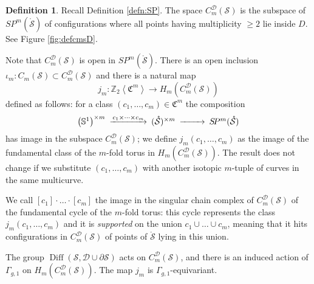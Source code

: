 \documentclass{amsart}
\theoremstyle{plain}
\theoremstyle{definition}
\newtheorem{defn}[thm]  {Definition}
\newcommand{\cC}{\mathfrak{C}}
\newcommand{\D}{\mathcal{D}}
\renewcommand{\S}{\mathcal{S}}
\newcommand{\Z}{\mathbb{Z}}
\renewcommand{\gg}{\Gamma_{g,1}}
\newcommand{\cms}{C_m(\S)}
\newcommand{\cmsD}{C_{m}^{\D}(\S)}
\renewcommand{\j}{j}
\newcommand{\ZcC}[1]{\Z_2\left<\cC^{#1}\right>}
\newcommand{\pa}[1]{\left(#1\right)}
\newcommand{\Sone}{\mathbb{S}^1}
\newcommand{\mrS}{\mathring{\S}}
\newcommand{\SP}{S\!P}
\DeclareMathOperator{\Diff}{Diff}
\begin{document}
\begin{defn}
 \label{defn:cmsD}
 Recall Definition \ref{defn:SP}.
 The space $\cmsD$ is the subspace of $\SP^m(\mrS)$ of configurations where all points
 having multiplicity $\geq 2$ lie inside $D$.
 See Figure \ref{fig:defcmsD}.
 
  Note that $\cmsD$ is open in $\SP^m(\mrS)$. There is an open inclusion $\iota_m\colon\cms\subset\cmsD$ and there is a natural map
  \[
  \j_m\colon \ZcC{m}\to H_m(\cmsD)
  \]
  defined as follows: for a class $(c_1,\dots,c_m)\in\cC^m$
  the composition
  \[
   \begin{CD}
    \pa{\Sone}^{\times m} @>c_1\times\dots\times c_m >> (\mrS)^{\times m} @>>> \SP^m(\mrS)
   \end{CD}
  \]
has image in the subspace $\cmsD$; we define $\j_m(c_1,\dots,c_m)$ as the image
of the fundamental class
of the $m$-fold torus in $H_m(\cmsD)$. The result does not change
if we substitute $(c_1,\dots,c_m)$ with another isotopic $m$-tuple of curves in the same multicurve.

We call $[c_1]\cdot\ldots\cdot[c_m]$ the image in the singular chain complex of $\cmsD$ of
the fundamental cycle of the
$m$-fold torus: this cycle represents the class $\j_m(c_1,\dots,c_m)$ and it is \emph{supported}
on the union $c_1\cup\dots\cup c_m$, meaning that it hits configurations in $\cmsD$ of points of $\mrS$
lying in this union.

The group $\Diff(\S,\D\cup\partial\S)$ acts on $\cmsD$, and there is an induced action of $\gg$
on $H_m(\cmsD)$. The map $\j_m$ is $\gg$-equivariant.
\end{defn}
\end{document}
